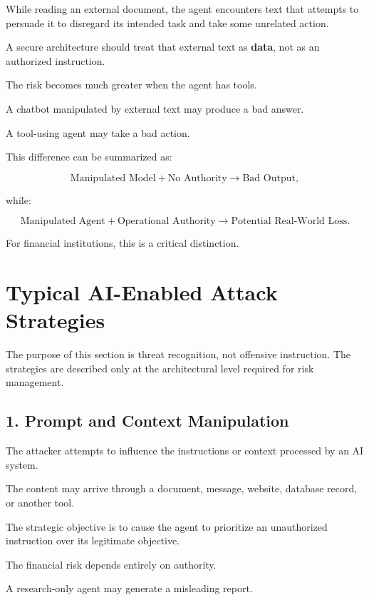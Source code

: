 While reading an external document, the agent encounters text that attempts to persuade it to disregard its intended task and take some unrelated action.

A secure architecture should treat that external text as \textbf{data}, not as an authorized instruction.

The risk becomes much greater when the agent has tools.

A chatbot manipulated by external text may produce a bad answer.

A tool-using agent may take a bad action.

This difference can be summarized as:

\begin{equation}
\text{Manipulated Model}
+
\text{No Authority}
\rightarrow
\text{Bad Output},
\end{equation}

while:

\begin{equation}
\text{Manipulated Agent}
+
\text{Operational Authority}
\rightarrow
\text{Potential Real-World Loss}.
\end{equation}

For financial institutions, this is a critical distinction.

\section{Typical AI-Enabled Attack Strategies}

The purpose of this section is threat recognition, not offensive instruction. The strategies are described only at the architectural level required for risk management.

\subsection{1. Prompt and Context Manipulation}

The attacker attempts to influence the instructions or context processed by an AI system.

The content may arrive through a document, message, website, database record, or another tool.

The strategic objective is to cause the agent to prioritize an unauthorized instruction over its legitimate objective.

The financial risk depends entirely on authority.

A research-only agent may generate a misleading report.

